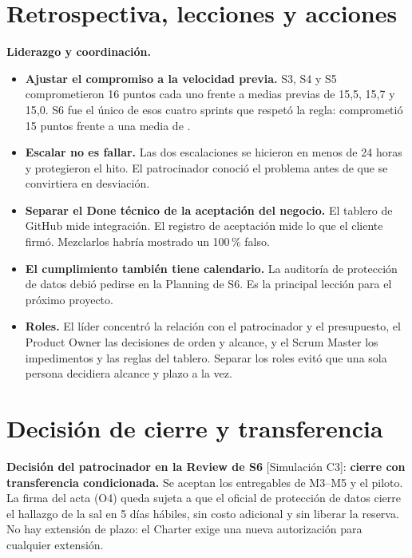 \documentclass[10pt,a4paper]{article}
\newcommand{\rot}[1]{\textsf{\scriptsize\color{gris}[#1]}}
\begin{document}
\section{Retrospectiva, lecciones y acciones}

\begin{table}[h]
\caption{Acciones de mejora con responsable y seguimiento (S1--S6)}\label{tab:retro}

\end{table}

\textbf{Liderazgo y coordinación.}
\begin{itemize}
\item \textbf{Ajustar el compromiso a la velocidad previa.} S3, S4 y S5 comprometieron 16 puntos cada uno frente a medias previas de 15,5, 15,7 y 15,0. S6 fue el único de esos cuatro sprints que respetó la regla: comprometió 15 puntos frente a una media de \VelMedia{}.
\item \textbf{Escalar no es fallar.} Las dos escalaciones se hicieron en menos de 24 horas y protegieron el hito. El patrocinador conoció el problema antes de que se convirtiera en desviación.
\item \textbf{Separar el Done técnico de la aceptación del negocio.} El tablero de GitHub mide integración. El registro de aceptación mide lo que el cliente firmó. Mezclarlos habría mostrado un 100\,\% falso.
\item \textbf{El cumplimiento también tiene calendario.} La auditoría de protección de datos debió pedirse en la Planning de S6. Es la principal lección para el próximo proyecto.
\item \textbf{Roles.} El líder concentró la relación con el patrocinador y el presupuesto, el Product Owner las decisiones de orden y alcance, y el Scrum Master los impedimentos y las reglas del tablero. Separar los roles evitó que una sola persona decidiera alcance y plazo a la vez.
\end{itemize}

\section{Decisión de cierre y transferencia}

\begin{tcolorbox}[colback=teal!6,colframe=teal!60,boxrule=0.5pt,arc=1mm]
\textbf{Decisión del patrocinador en la Review de S6} \rot{Simulación C3}: \textbf{cierre con transferencia condicionada.} Se aceptan los entregables de M3--M5 y el piloto. La firma del acta (O4) queda sujeta a que el oficial de protección de datos cierre el hallazgo de la sal en 5 días hábiles, sin costo adicional y sin liberar la reserva. No hay extensión de plazo: el Charter exige una nueva autorización para cualquier extensión.
\end{tcolorbox}
\end{document}
